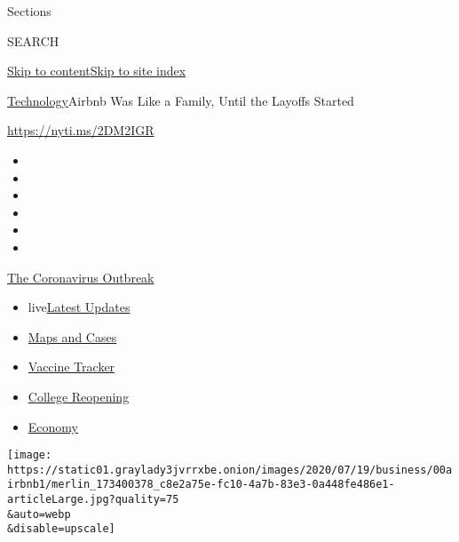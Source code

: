 Sections

SEARCH

\protect\hyperlink{site-content}{Skip to
content}\protect\hyperlink{site-index}{Skip to site index}

\href{/section/technology}{Technology}\textbar{}Airbnb Was Like a
Family, Until the Layoffs Started

\url{https://nyti.ms/2DM2IGR}

\begin{itemize}
\item
\item
\item
\item
\item
\item
\end{itemize}

\href{https://www.nytimes3xbfgragh.onion/news-event/coronavirus?action=click\&pgtype=Article\&state=default\&region=TOP_BANNER\&context=storylines_menu}{The
Coronavirus Outbreak}

\begin{itemize}
\tightlist
\item
  live\href{https://www.nytimes3xbfgragh.onion/2020/08/03/world/coronavirus-covid-19.html?action=click\&pgtype=Article\&state=default\&region=TOP_BANNER\&context=storylines_menu}{Latest
  Updates}
\item
  \href{https://www.nytimes3xbfgragh.onion/interactive/2020/us/coronavirus-us-cases.html?action=click\&pgtype=Article\&state=default\&region=TOP_BANNER\&context=storylines_menu}{Maps
  and Cases}
\item
  \href{https://www.nytimes3xbfgragh.onion/interactive/2020/science/coronavirus-vaccine-tracker.html?action=click\&pgtype=Article\&state=default\&region=TOP_BANNER\&context=storylines_menu}{Vaccine
  Tracker}
\item
  \href{https://www.nytimes3xbfgragh.onion/2020/08/02/us/covid-college-reopening.html?action=click\&pgtype=Article\&state=default\&region=TOP_BANNER\&context=storylines_menu}{College
  Reopening}
\item
  \href{https://www.nytimes3xbfgragh.onion/live/2020/08/03/business/stock-market-today-coronavirus?action=click\&pgtype=Article\&state=default\&region=TOP_BANNER\&context=storylines_menu}{Economy}
\end{itemize}

\texttt{[image: https://static01.graylady3jvrrxbe.onion/images/2020/07/19/business/00airbnb1/merlin\_173400378\_c8e2a75e-fc10-4a7b-83e3-0a448fe486e1-articleLarge.jpg?quality=75\\\&auto=webp\\\&disable=upscale]}

